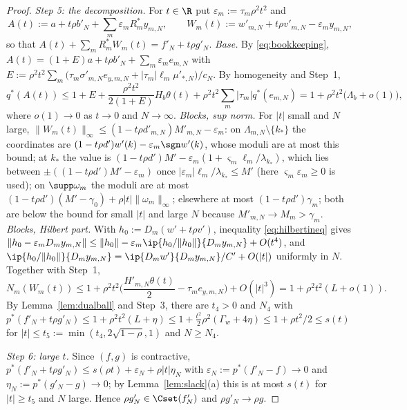 \begin{proof}
\emph{Step 5: the decomposition.}  For $t\in\R$ put
$\varepsilon_m:=\tau_m\rho^2t^2$ and
\[
 A(t):=a+t\rho b'_N+\sum_m\varepsilon_mR_m^*y_{m,N},\qquad
 W_m(t):=w'_{m,N}+t\rho v'_{m,N}-\varepsilon_my_{m,N},
\]
so that $A(t)+\sum_mR_m^*W_m(t)=f'_N+t\rho g'_N$.
\emph{Base.}  By \eqref{eq:bookkeeping},
$A(t)=(1+E)a+t\rho b'_N+\sum_m\varepsilon_me_{m,N}$ with
$E:=\rho^2t^2\sum_m\big(\tau_m\sigma'_{m,N}e_{y,m,N}+|\tau_m|\ell_m
\mu'_{*,N}\big)/c_N$.  By homogeneity and Step~1,
\[
 q^*(A(t))\le1+E+\frac{\rho^2t^2}{2(1+E)}H_b\theta(t)
 +\rho^2t^2\sum_m|\tau_m|q^*(e_{m,N})
 =1+\rho^2t^2\big(\Lambda_b+o(1)\big),
\]
where $o(1)\to0$ as $t\to0$ and $N\to\infty$.
\emph{Blocks, sup norm.}  For $|t|$ small and $N$ large,
$\|W_m(t)\|_\infty\le(1-t\rho d'_{m,N})M'_{m,N}-\varepsilon_m$: on
$\Lambda_{m,N}\setminus\{k_*\}$ the coordinates are
$(1-t\rho d')w'(k)-\varepsilon_m\sgn w'(k)$, whose moduli are at most this
bound; at $k_*$ the value is $(1-t\rho d')M'-\varepsilon_m(1+\varsigma_m
\ell_m/\lambda_{k_*})$, which lies between $\pm((1-t\rho
d')M'-\varepsilon_m)$ once $|\varepsilon_m|\ell_m/\lambda_{k_*}\le M'$ (here
$\varsigma_m\varepsilon_m\ge0$ is used); on $\supp\omega_m$ the moduli are at
most $(1-t\rho d')(M'-\gamma_0)+\rho|t|\|\omega_m\|_\infty$; elsewhere at
most $(1-t\rho d')\gamma_m$; both are below the bound for small $|t|$ and
large $N$ because $M'_{m,N}\to M_m>\gamma_m$.
\emph{Blocks, Hilbert part.}  With $h_0:=D_m(w'+t\rho v')$, inequality
\eqref{eq:hilbertineq} gives
$\|h_0-\varepsilon_mD_my_{m,N}\|\le\|h_0\|-\varepsilon_m\ip{h_0/\|h_0\|}{D_m
y_{m,N}}+O(t^4)$, and $\ip{h_0/\|h_0\|}{D_my_{m,N}}=
\ip{D_mw'}{D_my_{m,N}}/C'+O(|t|)$ uniformly in $N$.  Together with Step~1,
\[
 N_m(W_m(t))\le1+\rho^2t^2\Big(\frac{H'_{m,N}\theta(t)}2-\tau_me_{y,m,N}
 \Big)+O(|t|^3)=1+\rho^2t^2(L+o(1)).
\]
By Lemma~\ref{lem:dualball} and Step~3, there are $t_4>0$ and $N_4$ with
$p^*(f'_N+t\rho g'_N)\le1+\rho^2t^2(L+\eta)\le1+\frac{t^2}2\rho^2
(\Gamma_w+4\eta)\le1+\rho t^2/2\le s(t)$ for $|t|\le t_5:=\min(t_4,
2\sqrt{1-\rho},1)$ and $N\ge N_4$.

\emph{Step 6: large $t$.}  Since $(f,g)$ is contractive,
$p^*(f'_N+t\rho g'_N)\le s(\rho t)+\varepsilon_N+\rho|t|\eta_N$ with
$\varepsilon_N:=p^*(f'_N-f)\to0$ and $\eta_N:=p^*(g'_N-g)\to0$; by
Lemma~\ref{lem:slack}(a) this is at most $s(t)$ for $|t|\ge t_5$ and $N$
large.  Hence $\rho g'_N\in\Cset(f'_N)$ and $\rho g'_N\to\rho g$.
\end{proof}

